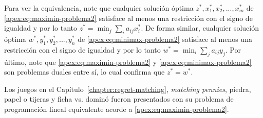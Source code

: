 Para ver la equivalencia, note que cualquier solución óptima $z^*, x_1^*, x_2^*, ..., x_m^*$ de \ref{apex:eq:maximin-problema2} satisface al menos una restricción con el signo de igualdad y por lo tanto $z^* = \min_j \sum_i a_{ij}x_i^*$. De forma similar, cualquier solución óptima $w^*, y_1^*, y_2^*, ..., y_n^*$ de \ref{apex:eq:minimax-problema2} satisface al menos una restricción con el signo de igualdad y por lo tanto $w^* = \min_i \sum_j a_{ij}y_j$. Por último, note que \ref{apex:eq:maximin-problema2} y \ref{apex:eq:minimax-problema2} son problemas duales entre sí, lo cual confirma que $z^* = w^*$.

Los juegos en el Capítulo~\ref{chapter:regret-matching}, \textit{matching pennies}, piedra, papel o tijeras y ficha vs. dominó fueron presentados con su problema de programación lineal equivalente acorde a \ref{apex:eq:maximin-problema2}.